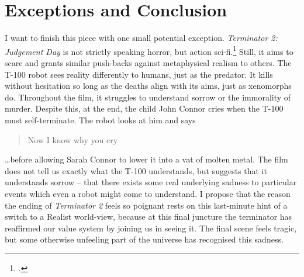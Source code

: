 \documentclass{article}
\begin{document}
\section{Exceptions and Conclusion}

I want to finish this piece with one small potential exception. \textit{Terminator 2: Judgement Day} is not strictly speaking horror, but action sci-fi.\footcite{terminator2} Still, it aims to scare and grants similar push-backs against metaphysical realism to others. The T-100 robot sees reality differently to humans, just as the predator. It kills without hesitation so long as the deaths align with its aims, just as xenomorphs do. Throughout the film, it struggles to understand sorrow or the immorality of murder. Despite this, at the end, the child John Connor cries when the T-100 must self-terminate. The robot looks at him and says \begin{quote}Now I know why you cry\end{quote}\ldots before allowing Sarah Connor to lower it into a vat of molten metal. The film does not tell us exactly what the T-100 understands, but suggests that it understands sorrow -- that there exists some real underlying sadness to particular events which even a robot might come to understand. I propose that the reason the ending of \textit{Terminator 2} feels so poignant rests on this last-minute hint of a switch to a Realist world-view, because at this final juncture the terminator has reaffirmed our value system by joining us in seeing it. The final scene feels tragic, but some otherwise unfeeling part of the universe has recognised this sadness.

\pagebreak

\printbibliography
\end{document}
